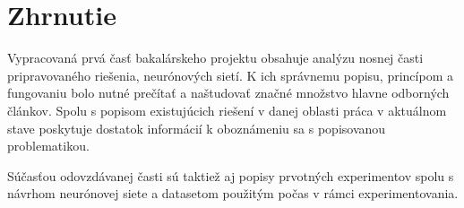 \newpage

\section{Zhrnutie}
 
Vypracovaná prvá časť bakalárskeho projektu obsahuje analýzu nosnej časti pripravovaného riešenia, neurónových sietí. K ich správnemu popisu, princípom a fungovaniu bolo nutné prečítať a naštudovať značné množstvo hlavne odborných článkov. Spolu s popisom existujúcich riešení v danej oblasti práca v aktuálnom stave poskytuje dostatok informácií k oboznámeniu sa s popisovanou problematikou. 

Súčasťou odovzdávanej časti sú taktiež aj popisy prvotných experimentov spolu s návrhom neurónovej siete a datasetom použitým počas v rámci experimentovania.
\newline


\iffalse
Plán a rozdelenie zvyšnej práce je zhruba nasledovný:

\textbf{Skúškové obdobie}
\begin{itemize}
	\item refaktorizácia a „upratanie" doterajšej práce (hlavne kódu)
	\item implementácia návrhu
	\item mať funkčný prototyp schopný predikcie
	\item otestovať rôzne možnosti učenia (meniť veľkosti batch-ov, rýchlosť,...)
	\item v januári prekonzulovať dosiahnuté výsledky spolu s ďalším postupom
\end{itemize}

\textbf{Letný semester}
\begin{itemize}
	\item refaktorizácia a optimalizácia riešenia
	\item postupné dopisovanie práce a dokumentácie
\end{itemize}

Vyššie uvedený plán je iba orientačný, určite sa bude meniť, či už v závislosti od vzniknutých problémov alebo množstva času nutného k splneniu jednotlivých bodov plánu a vypracovaniu častí práce.
\fi